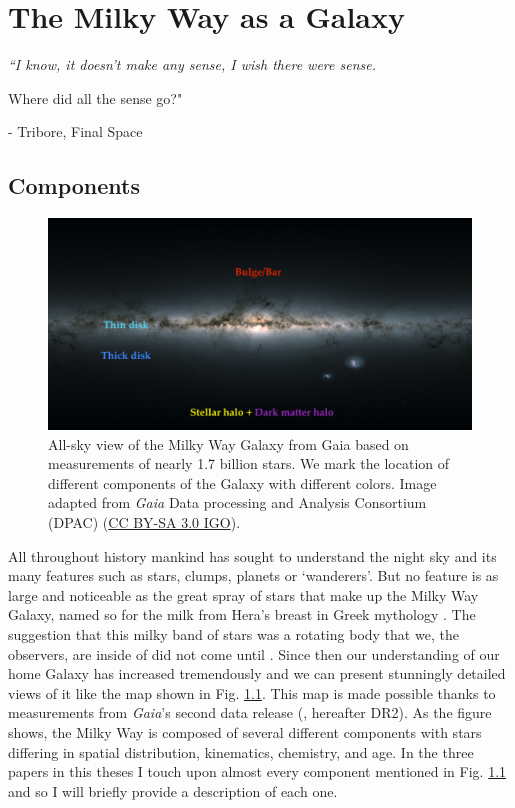 \chapter{The Milky Way as a Galaxy}\label{chap:milkyway}
\begin{flushright}
\textit{``I know, it doesn't make any sense, I wish there were sense.}
\end{flushright}
\begin{flushright}
Where did all the sense go?"

- Tribore, Final Space
\end{flushright}
\section{Components}\label{sec:components}
\begin{figure}[t]
    \centering
    \includegraphics[width=1\textwidth]{images/gaiasky.png}
    \caption{All-sky view of the Milky Way Galaxy from Gaia based on measurements of nearly 1.7 billion stars. We mark the location of different components of the Galaxy with different colors. Image adapted from \textit{Gaia} Data processing and Analysis Consortium (DPAC) (\href{https://creativecommons.org/licenses/by-sa/3.0/}{CC BY-SA 3.0 IGO}).} %
    \label{fig:gaiasky}
\end{figure}
All throughout history mankind has sought to understand the night sky and its many features such as stars, clumps, planets or `wanderers'. But no feature is as large and noticeable as the great spray of stars that make up the Milky Way Galaxy, named so for the milk from Hera's breast in Greek mythology \citep{leeming:98}. The suggestion that this milky band of stars was a rotating body that we, the observers, are inside of did not come until \cite{wright:1750}. Since then our understanding of our home Galaxy has increased tremendously and we can present stunningly detailed views of it like the map shown in Fig. \ref{fig:gaiasky}. This map is made possible thanks to measurements from \textit{Gaia}'s second data release (\citealt{dr2},  hereafter DR2). As the figure shows, the Milky Way is composed of several different components with stars differing in spatial distribution, kinematics, chemistry, and age. In the three papers in this theses I touch upon almost every component mentioned in Fig. \ref{fig:gaiasky} and so I will briefly provide a description of each one.

